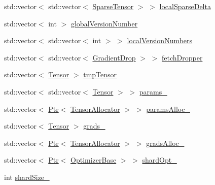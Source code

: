 \begin{DoxyCompactItemize}
\item 
std\+::vector$<$ std\+::vector$<$ \hyperlink{namespacemarian_a5484064f1fce2661d0b27a5c02a9392b}{Sparse\+Tensor} $>$ $>$ \hyperlink{classmarian_1_1AsyncGraphGroup_aa29abae307772ca69402a19729b2b49d}{local\+Sparse\+Delta}
\item 
std\+::vector$<$ int $>$ \hyperlink{classmarian_1_1AsyncGraphGroup_a75884703e6fe8efb3c75293eb912bce4}{global\+Version\+Number}
\item 
std\+::vector$<$ std\+::vector$<$ int $>$ $>$ \hyperlink{classmarian_1_1AsyncGraphGroup_a51752a96c753b4c3b34a4c8c3eec86ba}{local\+Version\+Numbers}
\item 
std\+::vector$<$ std\+::vector$<$ \hyperlink{namespacemarian_a000da7078105881168a3f17ce1b148bb}{Gradient\+Drop} $>$ $>$ \hyperlink{classmarian_1_1AsyncGraphGroup_a67f02023b00ba1a67e1f8894dbb7123a}{fetch\+Dropper}
\item 
std\+::vector$<$ \hyperlink{namespacemarian_a88b71ec34bb354564cddc24eb80f7e14}{Tensor} $>$ \hyperlink{classmarian_1_1AsyncGraphGroup_a5ae977ce219101bcf4166f123bbb8216}{tmp\+Tensor}
\item 
std\+::vector$<$ std\+::vector$<$ \hyperlink{namespacemarian_a88b71ec34bb354564cddc24eb80f7e14}{Tensor} $>$ $>$ \hyperlink{classmarian_1_1AsyncGraphGroup_ad1bf15e55cc12b90d39012303b14767b}{params\+\_\+}
\item 
std\+::vector$<$ \hyperlink{namespacemarian_ad1a373be43a00ef9ce35666145137b08}{Ptr}$<$ \hyperlink{classmarian_1_1TensorAllocator}{Tensor\+Allocator} $>$ $>$ \hyperlink{classmarian_1_1AsyncGraphGroup_ab881a69415a65b21d9741b6afa2d9f6f}{params\+Alloc\+\_\+}
\item 
std\+::vector$<$ \hyperlink{namespacemarian_a88b71ec34bb354564cddc24eb80f7e14}{Tensor} $>$ \hyperlink{classmarian_1_1AsyncGraphGroup_ad2f8bc6900976be4426acc4631d07145}{grads\+\_\+}
\item 
std\+::vector$<$ \hyperlink{namespacemarian_ad1a373be43a00ef9ce35666145137b08}{Ptr}$<$ \hyperlink{classmarian_1_1TensorAllocator}{Tensor\+Allocator} $>$ $>$ \hyperlink{classmarian_1_1AsyncGraphGroup_a0701944b0307c81dd518f57e452f2de6}{grads\+Alloc\+\_\+}
\item 
std\+::vector$<$ \hyperlink{namespacemarian_ad1a373be43a00ef9ce35666145137b08}{Ptr}$<$ \hyperlink{classmarian_1_1OptimizerBase}{Optimizer\+Base} $>$ $>$ \hyperlink{classmarian_1_1AsyncGraphGroup_a6a9bb34a29290c20f17e3ed25e08eff3}{shard\+Opt\+\_\+}
\item 
int \hyperlink{classmarian_1_1AsyncGraphGroup_a3af39dcadc6a7f84a4a906f2048fd420}{shard\+Size\+\_\+}

\end{DoxyCompactItemize}
